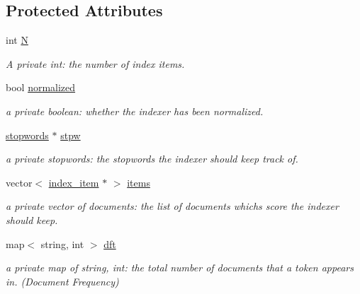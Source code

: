 \subsection*{Protected Attributes}
\begin{DoxyCompactItemize}
\item 
\mbox{\label{classindexer_a0742c29a845289118c3f4b75653be72c}} 
int \hyperlink{classindexer_a0742c29a845289118c3f4b75653be72c}{N}
\begin{DoxyCompactList}\small\item\em A private int\+: the number of index items. \end{DoxyCompactList}\item 
\mbox{\label{classindexer_a8c6e10131bfdffba3d221076176a16c7}} 
bool \hyperlink{classindexer_a8c6e10131bfdffba3d221076176a16c7}{normalized}
\begin{DoxyCompactList}\small\item\em a private boolean\+: whether the indexer has been normalized. \end{DoxyCompactList}\item 
\mbox{\label{classindexer_a627b020657c54f3c2ba35953311bf2b2}} 
\hyperlink{classstopwords}{stopwords} $\ast$ \hyperlink{classindexer_a627b020657c54f3c2ba35953311bf2b2}{stpw}
\begin{DoxyCompactList}\small\item\em a private stopwords\+: the stopwords the indexer should keep track of. \end{DoxyCompactList}\item 
\mbox{\label{classindexer_a3b00610add9f8f127eb1c1a22e8d7886}} 
vector$<$ \hyperlink{classindex__item}{index\+\_\+item} $\ast$ $>$ \hyperlink{classindexer_a3b00610add9f8f127eb1c1a22e8d7886}{items}
\begin{DoxyCompactList}\small\item\em a private vector of documents\+: the list of documents which\textquotesingle{}s score the indexer should keep. \end{DoxyCompactList}\item 
\mbox{\label{classindexer_a4de4c0d5adaa7b61ccd81e83ecef5de0}} 
map$<$ string, int $>$ \hyperlink{classindexer_a4de4c0d5adaa7b61ccd81e83ecef5de0}{dft}
\begin{DoxyCompactList}\small\item\em a private map of string, int\+: the total number of documents that a token appears in. (Document Frequency) \end{DoxyCompactList}\item 

\end{DoxyCompactItemize}
